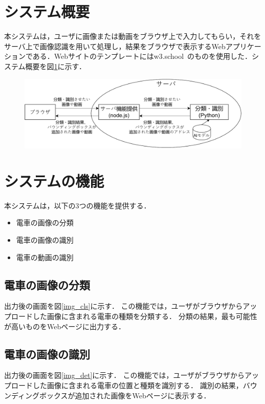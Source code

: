 \begin{multicols*}{2}
\section{システム概要}
本システムは，ユーザに画像または動画をブラウザ上で入力してもらい，それをサーバ上で画像認識を用いて処理し，結果をブラウザで表示するWebアプリケーションである．Webサイトのテンプレートにはw3.school~\cite{bk0}のものを使用した．システム概要を図\ref{abc}に示す．
\begin{figure} %
	\label{abc}
	\centering
	\includegraphics[width=\linewidth]{obj/sys_gaiyou6.pdf}
\end{figure}

\section{システムの機能}
本システムは，以下の3つの機能を提供する．
\begin{itemize}
	\item 電車の画像の分類
	\item 電車の画像の識別
	\item 電車の動画の識別
\end{itemize}


\subsection{電車の画像の分類} 
出力後の画面を図\ref{img_cls}に示す．
この機能では，ユーザがブラウザからアップロードした画像に含まれる電車の種類を分類する． 分類の結果，最も可能性が高いものをWebページに出力する．
\subsection{電車の画像の識別}
出力後の画面を図\ref{img_det}に示す．
この機能では，ユーザがブラウザからアップロードした画像に含まれる電車の位置と種類を識別する．  識別の結果，バウンディングボックスが追加された画像をWebページに表示する．

\end{multicols*}
